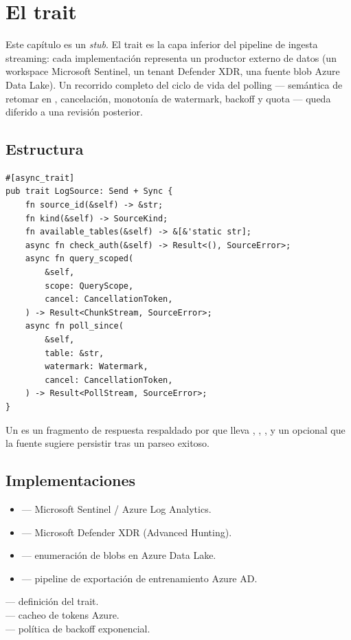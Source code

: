 \chapter{El trait }
\label{ch:logsource}

\begin{note}
Este capítulo es un \emph{stub}. El trait  es la
capa inferior del pipeline de ingesta streaming: cada
implementación representa un productor externo de datos (un
workspace Microsoft Sentinel, un tenant Defender XDR, una fuente
blob Azure Data Lake). Un recorrido completo del ciclo de vida
del polling --- semántica de retomar en ,
cancelación, monotonía de watermark, backoff y quota --- queda
diferido a una revisión posterior.
\end{note}

\section{Estructura}

\begin{lstlisting}[style=rust]
#[async_trait]
pub trait LogSource: Send + Sync {
    fn source_id(&self) -> &str;
    fn kind(&self) -> SourceKind;
    fn available_tables(&self) -> &[&'static str];
    async fn check_auth(&self) -> Result<(), SourceError>;
    async fn query_scoped(
        &self,
        scope: QueryScope,
        cancel: CancellationToken,
    ) -> Result<ChunkStream, SourceError>;
    async fn poll_since(
        &self,
        table: &str,
        watermark: Watermark,
        cancel: CancellationToken,
    ) -> Result<PollStream, SourceError>;
}
\end{lstlisting}

Un  es un fragmento de respuesta respaldado por
 que lleva , ,
, y un  opcional que
la fuente sugiere persistir tras un parseo exitoso.

\section{Implementaciones}

\begin{itemize}
    \item {}
          --- Microsoft Sentinel / Azure Log Analytics.
    \item {}
          --- Microsoft Defender XDR (Advanced Hunting).
    \item {}
          --- enumeración de blobs en Azure Data Lake.
    \item {}
          --- pipeline de exportación de entrenamiento Azure AD.
\end{itemize}

\begin{inthecode}
 ---
definición del trait.\\
 ---
cacheo de tokens Azure.\\
 --- política
de backoff exponencial.
\end{inthecode}
